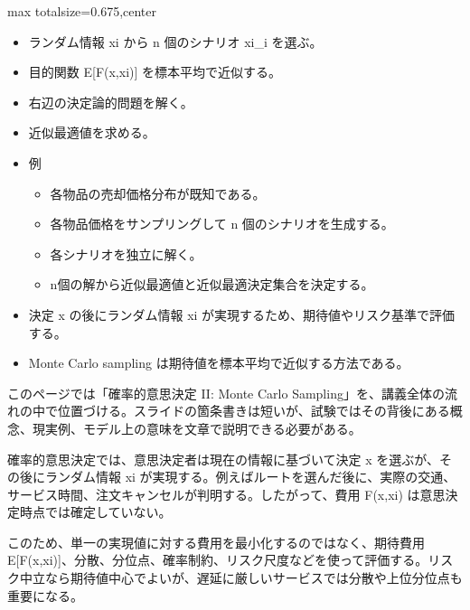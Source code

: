 \clearpage
{}
\begin{adjustbox}{max totalsize={\textwidth}{0.675\textheight},center}
\begin{minipage}{\textwidth}\scriptsize
\begin{minipage}[t]{0.485\textwidth}
\begin{itemize}
\item ランダム情報 xi から n 個のシナリオ xi\_i を選ぶ。
\item 目的関数 E[F(x,xi)] を標本平均で近似する。
\item 右辺の決定論的問題を解く。
\item 近似最適値を求める。
\item 例
\begin{itemize}
\item 各物品の売却価格分布が既知である。
\item 各物品価格をサンプリングして n 個のシナリオを生成する。
\item 各シナリオを独立に解く。
\item n個の解から近似最適値と近似最適決定集合を決定する。
\end{itemize}
\end{itemize}
\begin{itemize}
\item 決定 x の後にランダム情報 xi が実現するため、期待値やリスク基準で評価する。
\item Monte Carlo sampling は期待値を標本平均で近似する方法である。
\end{itemize}
\end{minipage}\hfill
\begin{minipage}[t]{0.485\textwidth}
このページでは「確率的意思決定 II: Monte Carlo Sampling」を、講義全体の流れの中で位置づける。スライドの箇条書きは短いが、試験ではその背後にある概念、現実例、モデル上の意味を文章で説明できる必要がある。\par
確率的意思決定では、意思決定者は現在の情報に基づいて決定 x を選ぶが、その後にランダム情報 xi が実現する。例えばルートを選んだ後に、実際の交通、サービス時間、注文キャンセルが判明する。したがって、費用 F(x,xi) は意思決定時点では確定していない。\par
このため、単一の実現値に対する費用を最小化するのではなく、期待費用 E[F(x,xi)]、分散、分位点、確率制約、リスク尺度などを使って評価する。リスク中立なら期待値中心でよいが、遅延に厳しいサービスでは分散や上位分位点も重要になる。\par

\end{minipage}
\end{minipage}
\end{adjustbox}
